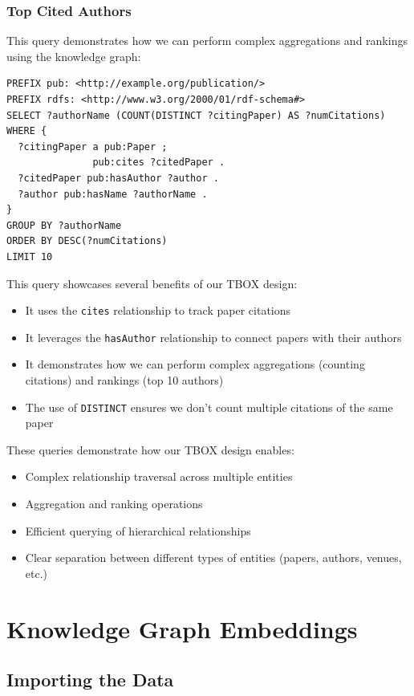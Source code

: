 \documentclass[10pt,a4paper]{article}
\begin{document}
\subsubsection{Top Cited Authors}
This query demonstrates how we can perform complex aggregations and rankings using the knowledge graph:

\begin{verbatim}
PREFIX pub: <http://example.org/publication/>
PREFIX rdfs: <http://www.w3.org/2000/01/rdf-schema#>
SELECT ?authorName (COUNT(DISTINCT ?citingPaper) AS ?numCitations)
WHERE {
  ?citingPaper a pub:Paper ;
               pub:cites ?citedPaper .
  ?citedPaper pub:hasAuthor ?author .
  ?author pub:hasName ?authorName .
}
GROUP BY ?authorName
ORDER BY DESC(?numCitations)
LIMIT 10
\end{verbatim}

This query showcases several benefits of our TBOX design:
\begin{itemize}
    \item It uses the \texttt{cites} relationship to track paper citations
    \item It leverages the \texttt{hasAuthor} relationship to connect papers with their authors
    \item It demonstrates how we can perform complex aggregations (counting citations) and rankings (top 10 authors)
    \item The use of \texttt{DISTINCT} ensures we don't count multiple citations of the same paper
\end{itemize}

These queries demonstrate how our TBOX design enables:
\begin{itemize}
    \item Complex relationship traversal across multiple entities
    \item Aggregation and ranking operations
    \item Efficient querying of hierarchical relationships
    \item Clear separation between different types of entities (papers, authors, venues, etc.)
\end{itemize}

\section{Knowledge Graph Embeddings}

\subsection{Importing the Data}
\end{document}
